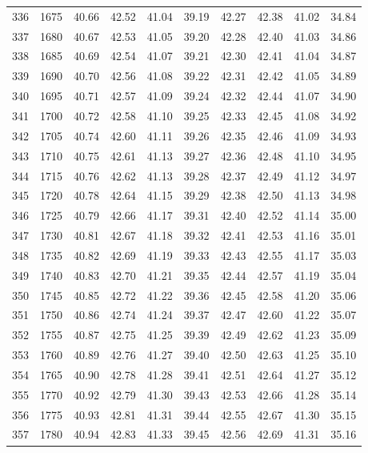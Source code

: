 \begin{longtable}{rrllllllll}
336 & 1675 & 40.66 & 42.52 & 41.04 & 39.19 & 42.27 & 42.38 & 41.02 & 34.84 \\ 
337 & 1680 & 40.67 & 42.53 & 41.05 & 39.20 & 42.28 & 42.40 & 41.03 & 34.86 \\ 
338 & 1685 & 40.69 & 42.54 & 41.07 & 39.21 & 42.30 & 42.41 & 41.04 & 34.87 \\ 
339 & 1690 & 40.70 & 42.56 & 41.08 & 39.22 & 42.31 & 42.42 & 41.05 & 34.89 \\ 
340 & 1695 & 40.71 & 42.57 & 41.09 & 39.24 & 42.32 & 42.44 & 41.07 & 34.90 \\ 
341 & 1700 & 40.72 & 42.58 & 41.10 & 39.25 & 42.33 & 42.45 & 41.08 & 34.92 \\ 
342 & 1705 & 40.74 & 42.60 & 41.11 & 39.26 & 42.35 & 42.46 & 41.09 & 34.93 \\ 
343 & 1710 & 40.75 & 42.61 & 41.13 & 39.27 & 42.36 & 42.48 & 41.10 & 34.95 \\ 
344 & 1715 & 40.76 & 42.62 & 41.13 & 39.28 & 42.37 & 42.49 & 41.12 & 34.97 \\ 
345 & 1720 & 40.78 & 42.64 & 41.15 & 39.29 & 42.38 & 42.50 & 41.13 & 34.98 \\ 
346 & 1725 & 40.79 & 42.66 & 41.17 & 39.31 & 42.40 & 42.52 & 41.14 & 35.00 \\ 
347 & 1730 & 40.81 & 42.67 & 41.18 & 39.32 & 42.41 & 42.53 & 41.16 & 35.01 \\ 
348 & 1735 & 40.82 & 42.69 & 41.19 & 39.33 & 42.43 & 42.55 & 41.17 & 35.03 \\ 
349 & 1740 & 40.83 & 42.70 & 41.21 & 39.35 & 42.44 & 42.57 & 41.19 & 35.04 \\ 
350 & 1745 & 40.85 & 42.72 & 41.22 & 39.36 & 42.45 & 42.58 & 41.20 & 35.06 \\ 
351 & 1750 & 40.86 & 42.74 & 41.24 & 39.37 & 42.47 & 42.60 & 41.22 & 35.07 \\ 
352 & 1755 & 40.87 & 42.75 & 41.25 & 39.39 & 42.49 & 42.62 & 41.23 & 35.09 \\ 
353 & 1760 & 40.89 & 42.76 & 41.27 & 39.40 & 42.50 & 42.63 & 41.25 & 35.10 \\ 
354 & 1765 & 40.90 & 42.78 & 41.28 & 39.41 & 42.51 & 42.64 & 41.27 & 35.12 \\ 
355 & 1770 & 40.92 & 42.79 & 41.30 & 39.43 & 42.53 & 42.66 & 41.28 & 35.14 \\ 
356 & 1775 & 40.93 & 42.81 & 41.31 & 39.44 & 42.55 & 42.67 & 41.30 & 35.15 \\ 
357 & 1780 & 40.94 & 42.83 & 41.33 & 39.45 & 42.56 & 42.69 & 41.31 & 35.16 \\ 

\end{longtable}
